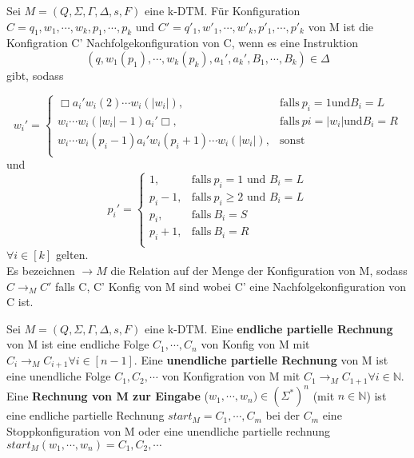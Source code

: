 \begin{sloppypar}
  Sei $M = (Q, \Sigma, \Gamma, \Delta, s, F)$ eine k-DTM. Für Konfiguration $C = q_{1}, w_{1}, \cdots, w_{k}, p_{1},\cdots, p_{k}$ und $C' = q'_{1}, w'_{1}, \cdots, w'_{k}, p'_{1},\cdots, p'_{k}$ von M ist die Konfigration C' Nachfolgekonfiguration von C, wenn es eine Instruktion \[(q, w_{1}(p_{1}), \cdots, w_{k}(p_{k}), a_{1}', a_{k}', B_{1}, \cdots, B_{k}) \in \Delta\] gibt, sodass 
\end{sloppypar}
\begin{equation*}
  w_{i}' = 
  \begin{cases}
    \Box a_{i}' w_{i}(2) \cdots w_{i}(|w_{i}|), & \text{falls}\ p_{i} = 1 \text{und}  B_{i} = L \\
    w_{i} \cdots w_{i}(|w_{i}| - 1) a_{i}' \Box, & \text{falls}\ p{i} = |w_{i}| \text{und} B_{i} = R \\
    w_{i} \cdots w_{i}(p_{i}-1) a_{i}' w_{i}(p_{i} + 1) \cdots w_{i}(|w_{i}|), & \text{sonst} \\
  \end{cases}
\end{equation*}
und 
\begin{equation*}
  p_{i}' = 
  \begin{cases}
    1, & \text{falls}\ p_{i} = 1 \text{ und } B_{i} = L\\
    p_{i} - 1, & \text{falls}\ p_{i} \geq 2 \text{ und } B_{i} = L\\
    p_{i}, & \text{falls}\ B_{i} = S\\
    p_{i} + 1, & \text{falls}\ B_{i} = R\\
  \end{cases}
\end{equation*}
$\forall i \in [k]$ gelten. \\ Es bezeichnen $\rightarrow M$ die Relation auf der Menge der Konfiguration von M, sodass $C \rightarrow_{M} C'$ falls C, C' Konfig von M sind wobei C' eine Nachfolgekonfiguration von C ist.

 Sei $M = (Q, \Sigma, \Gamma, \Delta, s, F)$ eine k-DTM. Eine \textbf{endliche partielle Rechnung} von M ist eine endliche Folge $C_{1}, \cdots, C_{n}$ von Konfig von M mit $C_{i} \rightarrow_{M} C_{i+1} \forall i \in [n-1]$. Eine \textbf{unendliche partielle Rechnung} von M ist eine unendliche Folge $C_{1}, C_{2}, \cdots$ von Konfigration von M mit $C_{1} \rightarrow_{M} C_{1+1} \forall i \in \mathbb{N}$. Eine \textbf{Rechnung von M zur Eingabe } ($w_{1}, \cdots
, w_{n}) \in (\Sigma^*)^n$ (mit $n \in \mathbb{N}$) ist eine endliche partielle Rechnung $start_M = C_1, \cdots, C_m$ bei der $C_m$ eine Stoppkonfiguration von M oder eine unendliche partielle rechnung $start_M(w_1, \cdots, w_n) = C_1, C_2, \cdots$

